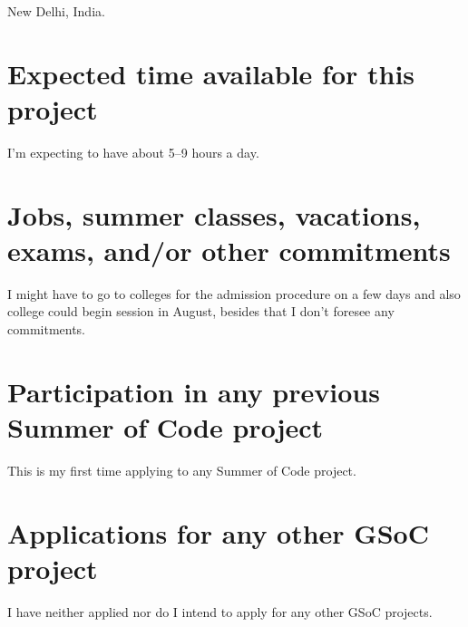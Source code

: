 \documentclass[11pt]{article}
\begin{document}
    New Delhi, India.




    \section{Expected time available for this project}
    \label{sec:availability}

    I'm expecting to have about 5--9 hours a day.




    \section{Jobs, summer classes, vacations, exams, and/or other commitments}
    \label{sec:commitments}

    I might have to go to colleges for the admission procedure on a few days and also college could begin session in
    August, besides that I don't foresee any commitments.




    \section{Participation in any previous Summer of Code project}
    \label{sec:previous-participation}

    This is my first time applying to any Summer of Code project.




    \section{Applications for any other GSoC project}
    \label{sec:other-applications}

    I have neither applied nor do I intend to apply for any other GSoC projects.


\end{document}

